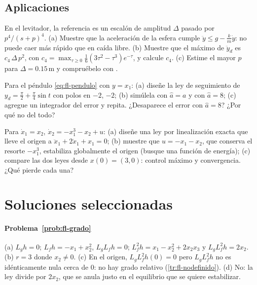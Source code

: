 \subsection*{Aplicaciones}

\begin{problema}\label{prob:fl-filtro}
\etiquetaM{} En el levitador, la referencia es un escalón de amplitud $\Delta$ pasado por $p^4/(s+p)^4$. (a) Muestre que la aceleración de la esfera cumple $\ddot y\le g-\frac km\dot y$: no puede caer más rápido que en caída libre. (b) Muestre que el máximo de $\ddot y_d$ es $c_4\,\Delta\,p^2$, con $c_4=\max_{\tau\ge0}\tfrac16(3\tau^2-\tau^3)e^{-\tau}$, y calcule $c_4$. (c) Estime el mayor $p$ para $\Delta=0.15$\,m y compruébelo con .
\end{problema}

\begin{problema}\label{prob:fl-pendulo}
\etiquetaM{} Para el péndulo \eqref{eq:fl-pendulo} con $y=x_1$: (a) diseñe la ley de seguimiento de $y_d=\tfrac\pi2+\tfrac\pi4\sin t$ con polos en $-2$, $-2$; (b) simúlela con $\hat a=a$ y con $\hat a=8$; (c) agregue un integrador del error y repita. ¿Desaparece el error con $\hat a=8$? ¿Por qué no del todo?
\end{problema}

\begin{problema}[cancelar o no]\label{prob:fl-cancelar}
\etiquetaEstrella{} Para $\dot x_1=x_2$, $\dot x_2=-x_1^3-x_2+u$: (a) diseñe una ley por linealización exacta que lleve el origen a $\ddot x_1+2\dot x_1+x_1=0$; (b) muestre que $u=-x_1-x_2$, que conserva el resorte $-x_1^3$, estabiliza globalmente el origen (busque una función de energía); (c) compare las dos leyes desde $x(0)=(3,0)$: control máximo y convergencia. ¿Qué pierde cada una?
\end{problema}

\section{Soluciones seleccionadas}

\paragraph{Problema~\ref{prob:fl-grado}}
(a) $L_gh=0$; $L_fh=-x_1+x_2^2$, $L_gL_fh=0$; $L_f^2h=x_1-x_2^2+2x_2x_3$ y $L_gL_f^2h=2x_2$. (b) $r=3$ donde $x_2\neq0$. (c) En el origen, $L_gL_f^2h(0)=0$ pero $L_gL_f^2h$ no es idénticamente nula cerca de $0$: no hay grado relativo (\cref{tr:fl-nodefinido}). (d) No: la ley divide por $2x_2$, que se anula justo en el equilibrio que se quiere estabilizar.

